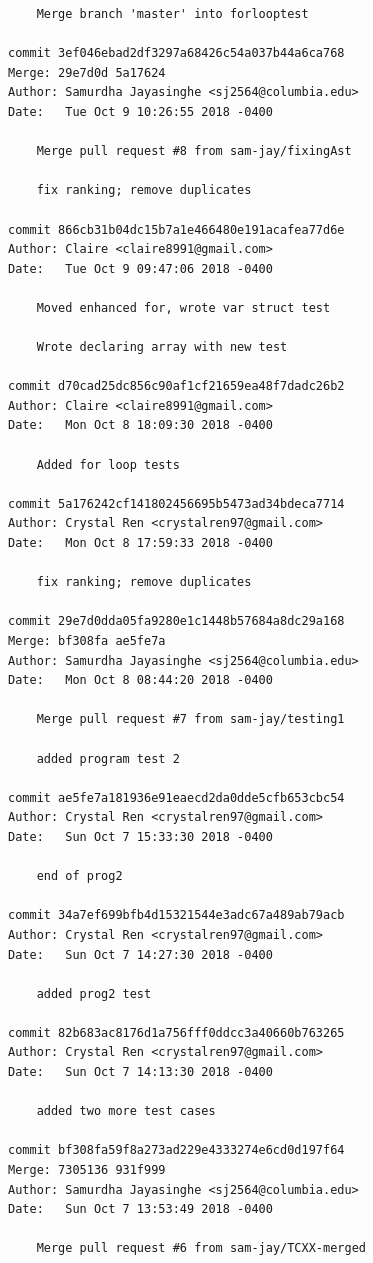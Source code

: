 \documentclass[12pt]{article}
\begin{document}
\begin{lstlisting}
    Merge branch 'master' into forlooptest

commit 3ef046ebad2df3297a68426c54a037b44a6ca768
Merge: 29e7d0d 5a17624
Author: Samurdha Jayasinghe <sj2564@columbia.edu>
Date:   Tue Oct 9 10:26:55 2018 -0400

    Merge pull request #8 from sam-jay/fixingAst
    
    fix ranking; remove duplicates

commit 866cb31b04dc15b7a1e466480e191acafea77d6e
Author: Claire <claire8991@gmail.com>
Date:   Tue Oct 9 09:47:06 2018 -0400

    Moved enhanced for, wrote var struct test
    
    Wrote declaring array with new test

commit d70cad25dc856c90af1cf21659ea48f7dadc26b2
Author: Claire <claire8991@gmail.com>
Date:   Mon Oct 8 18:09:30 2018 -0400

    Added for loop tests

commit 5a176242cf141802456695b5473ad34bdeca7714
Author: Crystal Ren <crystalren97@gmail.com>
Date:   Mon Oct 8 17:59:33 2018 -0400

    fix ranking; remove duplicates

commit 29e7d0dda05fa9280e1c1448b57684a8dc29a168
Merge: bf308fa ae5fe7a
Author: Samurdha Jayasinghe <sj2564@columbia.edu>
Date:   Mon Oct 8 08:44:20 2018 -0400

    Merge pull request #7 from sam-jay/testing1
    
    added program test 2

commit ae5fe7a181936e91eaecd2da0dde5cfb653cbc54
Author: Crystal Ren <crystalren97@gmail.com>
Date:   Sun Oct 7 15:33:30 2018 -0400

    end of prog2

commit 34a7ef699bfb4d15321544e3adc67a489ab79acb
Author: Crystal Ren <crystalren97@gmail.com>
Date:   Sun Oct 7 14:27:30 2018 -0400

    added prog2 test

commit 82b683ac8176d1a756fff0ddcc3a40660b763265
Author: Crystal Ren <crystalren97@gmail.com>
Date:   Sun Oct 7 14:13:30 2018 -0400

    added two more test cases

commit bf308fa59f8a273ad229e4333274e6cd0d197f64
Merge: 7305136 931f999
Author: Samurdha Jayasinghe <sj2564@columbia.edu>
Date:   Sun Oct 7 13:53:49 2018 -0400

    Merge pull request #6 from sam-jay/TCXX-merged
    

\end{lstlisting}
\end{document}
